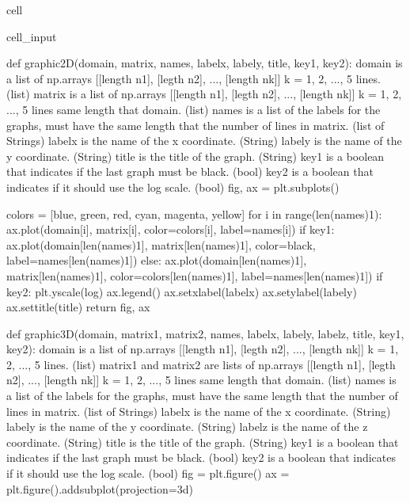\documentclass[letterpaper,10pt,english]{jupyterBook}
\begin{document}
\begin{sphinxuseclass}{cell}
\begin{sphinxVerbatimInput}
\begin{sphinxuseclass}{cell_input}
\begin{sphinxVerbatim}[commandchars=\\\{\}]
def graphic\PYGZus{}2D(domain, matrix, names, labelx, labely, title, key1, key2):
  \PYGZsq{}\PYGZsq{}\PYGZsq{}
  domain is a list of np.arrays [[length n1], [legth n2], ..., [length nk]]
  k = 1, 2, ..., 5 lines. (list)
  matrix is a list of np.arrays [[length n1], [legth n2], ..., [length nk]]
  k = 1, 2, ..., 5 lines \PYGZhy{} same length that domain. (list)
  names is a list of the labels for the graphs, must have the same length that
  the number of lines in matrix. (list of Strings)
  labelx is the name of the x coordinate. (String)
  labely is the name of the y coordinate. (String)
  title is the title of the graph. (String)
  key1 is a boolean that indicates if the last graph must be black. (bool)
  key2 is a boolean that indicates if it should use the log scale. (bool)
  \PYGZsq{}\PYGZsq{}\PYGZsq{}
  fig, ax = plt.subplots()

  colors = [\PYGZsq{}blue\PYGZsq{}, \PYGZsq{}green\PYGZsq{}, \PYGZsq{}red\PYGZsq{}, \PYGZsq{}cyan\PYGZsq{}, \PYGZsq{}magenta\PYGZsq{}, \PYGZsq{}yellow\PYGZsq{}]
  for i in range(len(names)\PYGZhy{}1):
    ax.plot(domain[i], matrix[i], color=colors[i], label=names[i])
  if key1:
    ax.plot(domain[len(names)\PYGZhy{}1], matrix[len(names)\PYGZhy{}1], color=\PYGZsq{}black\PYGZsq{}, label=names[len(names)\PYGZhy{}1])
  else:
    ax.plot(domain[len(names)\PYGZhy{}1], matrix[len(names)\PYGZhy{}1], color=colors[len(names)\PYGZhy{}1], label=names[len(names)\PYGZhy{}1])
  if key2:
    plt.yscale(\PYGZsq{}log\PYGZsq{})
  ax.legend()
  ax.set\PYGZus{}xlabel(labelx)
  ax.set\PYGZus{}ylabel(labely)
  ax.set\PYGZus{}title(title)
  return fig, ax

def graphic\PYGZus{}3D(domain, matrix1, matrix2, names, labelx, labely, labelz, title, key1, key2):
  \PYGZsq{}\PYGZsq{}\PYGZsq{}
  domain is a list of np.arrays [[length n1], [legth n2], ..., [length nk]]
  k = 1, 2, ..., 5 lines. (list)
  matrix1 and matrix2 are lists of np.arrays [[length n1], [legth n2], ..., [length nk]]
  k = 1, 2, ..., 5 lines \PYGZhy{} same length that domain. (list)
  names is a list of the labels for the graphs, must have the same length that
  the number of lines in matrix. (list of Strings)
  labelx is the name of the x coordinate. (String)
  labely is the name of the y coordinate. (String)
  labelz is the name of the z coordinate. (String)
  title is the title of the graph. (String)
  key1 is a boolean that indicates if the last graph must be black. (bool)
  key2 is a boolean that indicates if it should use the log scale. (bool)
  \PYGZsq{}\PYGZsq{}\PYGZsq{}
  fig = plt.figure()
  ax = plt.figure().add\PYGZus{}subplot(projection=\PYGZsq{}3d\PYGZsq{})


\end{sphinxVerbatim}
\end{sphinxuseclass}
\end{sphinxVerbatimInput}
\end{sphinxuseclass}
\end{document}
